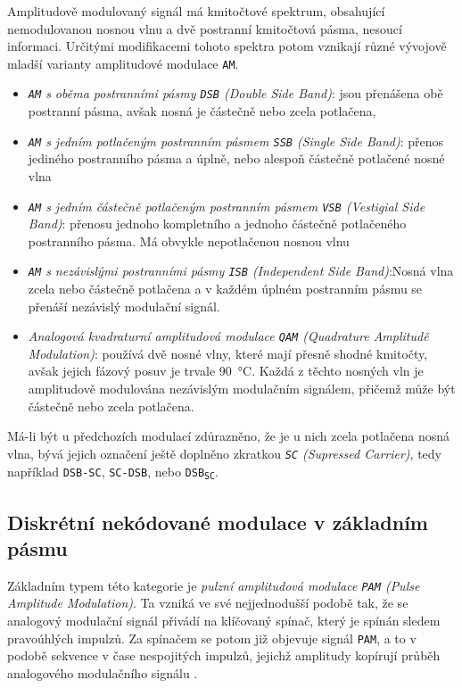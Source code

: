       Amplitudově modulovaný signál má kmitočtové spektrum, obsahující nemodulovanou nosnou vlnu a 
      dvě postranní kmitočtová pásma, nesoucí informaci. Určitými modifikacemi tohoto spektra potom 
      vznikají různé vývojově mladší varianty amplitudové modulace \texttt{AM}. 
      \begin{itemize}
        \item \emph{\texttt{AM} s oběma postranními pásmy \texttt{DSB} (Double Side Band)}: jsou 
               přenášena obě postranní pásma, avšak nosná je částečně nebo zcela potlačena,
        \item \emph{\texttt{AM} s jedním potlačeným postranním pásmem \texttt{SSB} (Single Side 
               Band)}: přenos jediného postranního pásma a úplně, nebo alespoň částečně potlačené 
               nosné vlna
        \item \emph{\texttt{AM} s jedním částečně potlačeným postranním pásmem \texttt{VSB} 
               (Vestigial Side Band)}: přenosu jednoho kompletního a jednoho částečně potlačeného 
               postranního pásma. Má obvykle nepotlačenou nosnou vlnu 
        \item \emph{\texttt{AM} s nezávislými postranními pásmy \texttt{ISB} (Independent Side 
               Band)}:Nosná vlna zcela nebo částečně potlačena a v každém úplném postranním pásmu 
               se přenáší nezávislý modulační signál.
        \item \emph{Analogová kvadraturní amplitudová modulace \texttt{QAM} (Quadrature Amplitudě 
               Modulation)}: používá dvě nosné vlny, které mají přesně shodné kmitočty, avšak 
               jejich fázový posuv je trvale \qty{90}{\degreeCelsius}. Každá z těchto nosných vln je 
               amplitudově modulována nezávislým modulačním signálem, přičemž může být částečně 
               nebo zcela potlačena.
      \end{itemize}
      
      Má-li být u předchozích modulací zdůrazněno, že je u nich zcela potlačena nosná vlna, bývá 
      jejich označení ještě doplněno zkratkou \emph{\texttt{SC} (Supressed Carrier)}, tedy 
      například \texttt{DSB-SC}, \texttt{SC-DSB}, nebo \texttt{DSB\textsubscript{SC}}.
      
    \subsection{Diskrétní nekódované modulace v základním pásmu}
      Základním typem této kategorie je \emph{pulzní amplitudová modulace \texttt{PAM} (Pulse 
      Amplitude Modulation)}. Ta vzniká ve své nejjednodušší podobě tak, že se analogový modulační 
      signál přivádí na klíčovaný spínač, který je spínán sledem pravoúhlých impulzů. Za spínačem 
      se potom již objevuje signál \texttt{PAM}, a to v podobě sekvence v čase nespojitých impulzů, 
      jejichž amplitudy kopírují průběh analogového modulačního signálu \cite[s.~84]{ZaludRA}.
      
